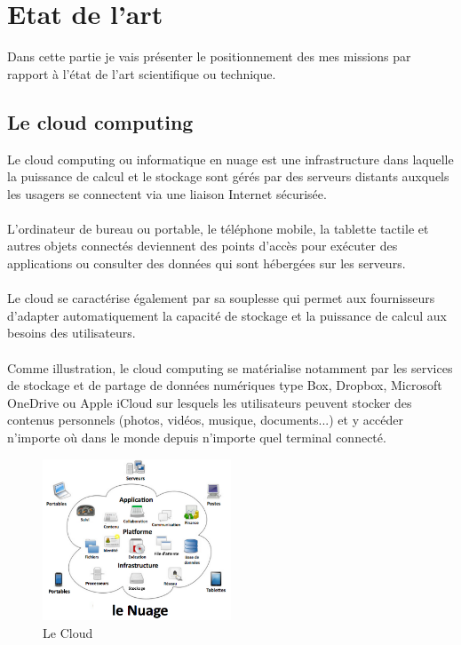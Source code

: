 
\chapter{Etat de l’art} %

\label{Chaptre3} %

Dans cette partie je vais  présenter le positionnement des mes missions par rapport à l’état de l’art scientifique ou technique.
\section{Le cloud computing}
Le cloud computing ou informatique en nuage est une infrastructure dans laquelle la puissance de calcul et le stockage sont gérés par des serveurs distants auxquels les usagers se connectent via une liaison Internet sécurisée.\\ \\ L'ordinateur de bureau ou portable, le téléphone mobile, la tablette tactile et autres objets connectés deviennent des points d'accès pour exécuter des applications ou consulter des données qui sont hébergées sur les serveurs. \\ \\ Le cloud se caractérise également par sa souplesse qui permet aux fournisseurs d'adapter automatiquement la capacité de stockage et la puissance de calcul aux besoins des utilisateurs.\\ \\
Comme illustration, le cloud computing se matérialise notamment par les services de stockage et de partage de données numériques type Box, Dropbox, Microsoft OneDrive ou Apple iCloud sur lesquels les utilisateurs peuvent stocker des contenus personnels (photos, vidéos, musique, documents...) et y accéder n'importe où dans le monde depuis n'importe quel terminal connecté.
 \begin{figure}[H]
            \centering
                \includegraphics[width=0.5\textwidth]{Figures/cloud}
	       \decoRule
		\caption[Le Cloud]{Le Cloud}
	\label{fig:Cloud}
	\end{figure}
